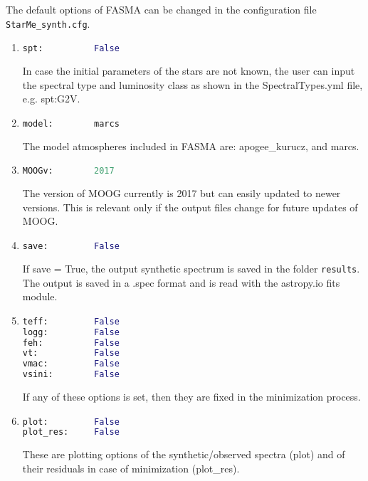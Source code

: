 \documentclass[a4paper,12pt]{article}
\begin{document}
The default options of FASMA can be changed in the configuration file \texttt{StarMe\_synth.cfg}.
\begin{enumerate}
 \item
\begin{lstlisting}[language=Python]
spt:          False

\end{lstlisting}
In case the initial parameters of the stars are not known, the user can input the spectral type and luminosity class as shown in the SpectralTypes.yml file, e.g. spt:G2V.

\item
\begin{lstlisting}[language=Python]
model:        marcs
\end{lstlisting}
The model atmospheres included in FASMA are: apogee\_kurucz, and marcs.

\item
\begin{lstlisting}[language=Python]
MOOGv:        2017
\end{lstlisting}

The version of MOOG currently is 2017 but can easily updated to newer versions. This is relevant only if the output files change for future updates of MOOG.

\item
\begin{lstlisting}[language=Python]
save:         False
\end{lstlisting}
If save = True, the output synthetic spectrum is saved in the folder \texttt{results}. The output is saved in a .spec format and is read with the astropy.io fits module.

\item
\begin{lstlisting}[language=Python]
teff:         False
logg:         False
feh:          False
vt:           False
vmac:         False
vsini:        False
\end{lstlisting}
If any of these options is set, then they are fixed in the minimization process. 

\item
\begin{lstlisting}[language=Python]
plot:         False
plot_res:     False
\end{lstlisting}
These are plotting options of the synthetic/observed spectra (plot) and of their residuals in case of minimization (plot\_res).


\end{enumerate}
\end{document}
